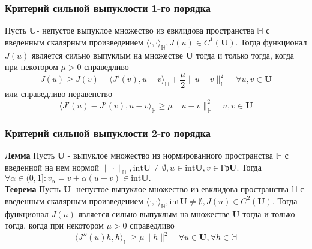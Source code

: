 \documentclass[A4]{article}
\begin{document}
\subsubsection{Критерий сильной выпуклости 1-го порядка}
Пусть $\mathbf{U}$- непустое выпуклое множество из евклидова пространства $\mathbb{H}$ с введенным скалярным произведением $\langle\cdot,\cdot\rangle_{\mathbb{H}},J(u)\in C^1(\mathbf{U})$. Тогда функционал $J(u)$ является сильно выпуклым на множестве $\mathbf{U}$ тогда и только тогда, когда при некотором $\mu>0$ справедливо 
\begin{equation*}
J(u)\geqslant J(v)+\langle J'(v),u-v\rangle_{\mathbb{H}}+\frac{\mu}{2}\|u-v\|^2_{\mathbb{H}}\quad \forall u,v\in\mathbf{U}
\end{equation*}
или справедливо неравенство
\begin{equation*}
\langle J'(u)-J'(v),u-v\rangle_{\mathbb{H}}\geqslant\mu\|u-v\|^2_{\mathbb{H}}\quad u,v\in\mathbf{U}
\end{equation*}
\subsubsection{Критерий сильной выпуклости 2-го порядка}
\textbf{Лемма} Пусть $\mathbf{U}$ - выпуклое множество из нормированного пространства $\mathbb{H}$ с введенной на нем нормой $\|\cdot\|_{\mathbb{H}},\text{int}\mathbf{U}\ne\emptyset,u\in\text{int}\mathbf{U},v\in\text{Гр}\mathbf{U}$. Тогда $\forall\alpha\in(0,1]:v_{\alpha}=v+\alpha(u-v)\in\text{int}\mathbf{U}.$\\
\textbf{Теорема} Пусть $\mathbf{U}$- непустое выпуклое множество из евклидова пространства $\mathbb{H}$ с введенным скалярным произведением $\langle\cdot,\cdot\rangle_{\mathbb{H}},\text{int}\mathbf{U}\ne\emptyset,J(u)\in C^2(\mathbf{U})$. Тогда функционал $J(u)$ является сильно выпуклым на множестве $\mathbf{U}$ тогда и только тогда, когда при некотором $\mu>0$ справедливо 
\begin{equation*}
\langle J''(u)h,h\rangle_{\mathbb{H}}\geqslant\mu\|h\|^2\quad\forall u\in\mathbf{U},\forall h\in\mathbb{H}
\end{equation*}
\end{document}
